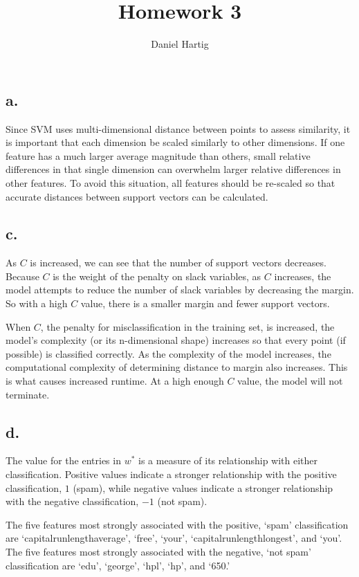 \documentclass{article}
\title{Homework 3}
\author{Daniel Hartig}
\begin{document}
\maketitle

\subsection*{a.}
Since SVM uses multi-dimensional distance between points to assess similarity, it is important that each dimension be scaled similarly to other dimensions. If one feature has a much larger average magnitude than others, small relative differences in that single dimension can overwhelm larger relative differences in other features. To avoid this situation, all features should be re-scaled so that accurate distances between support vectors can be calculated.

\subsection*{c.}

As $C$ is increased, we can see that the number of support vectors decreases. Because $C$ is the weight of the penalty on slack variables, as $C$ increases, the model attempts to reduce the number of slack variables by decreasing the margin. So with a high $C$ value, there is a smaller margin and fewer support vectors.

When $C$, the penalty for misclassification in the training set, is increased, the model's complexity (or its n-dimensional shape) increases so that every point (if possible) is classified correctly. As the complexity of the model increases, the computational complexity of determining distance to margin also increases. This is what causes increased runtime. At a high enough $C$ value, the model will not terminate. 

\subsection*{d.}
The value for the entries in $w^*$ is a measure of its relationship with either classification. Positive values indicate a stronger relationship with the positive classification, $1$ (spam), while negative values indicate a stronger relationship with the negative classification, $-1$ (not spam).

The five features most strongly associated with the positive, `spam' classification are `capital\textunderscore run\textunderscore length\textunderscore average', `free', `your', `capital\textunderscore run\textunderscore length\textunderscore longest', and `you'. The five features most strongly associated with the negative, `not spam' classification are `edu', `george', `hpl', `hp', and `650.'
\end{document}
